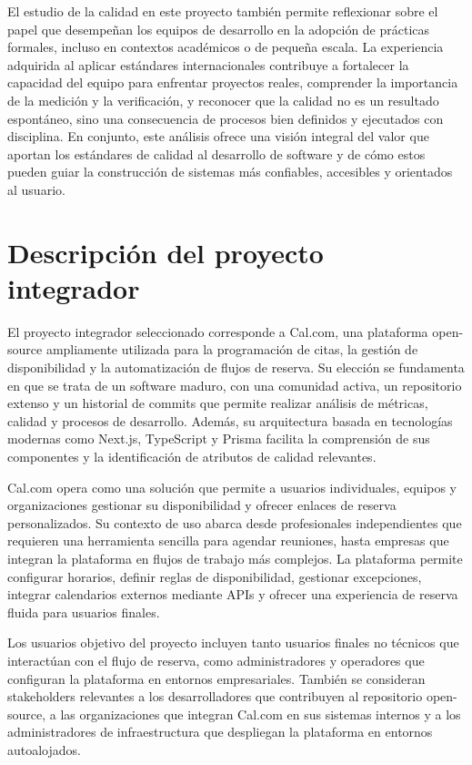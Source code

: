 \documentclass{article}
\begin{document}
El estudio de la calidad en este proyecto también permite reflexionar sobre el papel que desempeñan los equipos de desarrollo en la adopción de prácticas formales, incluso en contextos académicos o de pequeña escala. La experiencia adquirida al aplicar estándares internacionales contribuye a fortalecer la capacidad del equipo para enfrentar proyectos reales, comprender la importancia de la medición y la verificación, y reconocer que la calidad no es un resultado espontáneo, sino una consecuencia de procesos bien definidos y ejecutados con disciplina. En conjunto, este análisis ofrece una visión integral del valor que aportan los estándares de calidad al desarrollo de software y de cómo estos pueden guiar la construcción de sistemas más confiables, accesibles y orientados al usuario.

\newpage
\section{Descripción del proyecto integrador}
El proyecto integrador seleccionado corresponde a Cal.com, una plataforma open-source ampliamente utilizada para la programación de citas, la gestión de disponibilidad y la automatización de flujos de reserva. Su elección se fundamenta en que se trata de un software maduro, con una comunidad activa, un repositorio extenso y un historial de commits que permite realizar análisis de métricas, calidad y procesos de desarrollo. Además, su arquitectura basada en tecnologías modernas como Next.js, TypeScript y Prisma facilita la comprensión de sus componentes y la identificación de atributos de calidad relevantes.

Cal.com opera como una solución que permite a usuarios individuales, equipos y organizaciones gestionar su disponibilidad y ofrecer enlaces de reserva personalizados. Su contexto de uso abarca desde profesionales independientes que requieren una herramienta sencilla para agendar reuniones, hasta empresas que integran la plataforma en flujos de trabajo más complejos. La plataforma permite configurar horarios, definir reglas de disponibilidad, gestionar excepciones, integrar calendarios externos mediante APIs y ofrecer una experiencia de reserva fluida para usuarios finales.

Los usuarios objetivo del proyecto incluyen tanto usuarios finales no técnicos que interactúan con el flujo de reserva, como administradores y operadores que configuran la plataforma en entornos empresariales. También se consideran stakeholders relevantes a los desarrolladores que contribuyen al repositorio open-source, a las organizaciones que integran Cal.com en sus sistemas internos y a los administradores de infraestructura que despliegan la plataforma en entornos autoalojados.
\end{document}
